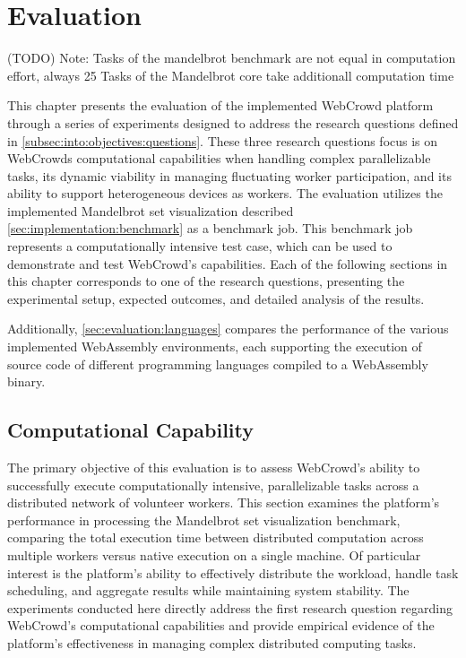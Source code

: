 \chapter{Evaluation}
\label{ch:evaluation}
(TODO) Note: Tasks of the mandelbrot benchmark are not equal in computation effort, always 25 Tasks of the Mandelbrot core take additionall computation time

This chapter presents the evaluation of the implemented WebCrowd platform through a series of experiments designed to address the research questions defined in \autoref{subsec:into:objectives:questions}. These three research questions focus is on WebCrowds computational capabilities when handling complex parallelizable tasks, its dynamic viability in managing fluctuating worker participation, and its ability to support heterogeneous devices as workers. The evaluation utilizes the implemented Mandelbrot set visualization described \autoref{sec:implementation:benchmark} as a benchmark job. This benchmark job represents a computationally intensive test case, which can be used to demonstrate and test WebCrowd's capabilities. Each of the following sections in this chapter corresponds to one of the research questions, presenting the experimental setup, expected outcomes, and detailed analysis of the results.

Additionally, \autoref{sec:evaluation:languages} compares the performance of the various implemented WebAssembly environments, each supporting the execution of source code of different programming languages compiled to a WebAssembly binary.

\section{Computational Capability}
The primary objective of this evaluation is to assess WebCrowd's ability to successfully execute computationally intensive, parallelizable tasks across a distributed network of volunteer workers. This section examines the platform's performance in processing the Mandelbrot set visualization benchmark, comparing the total execution time between distributed computation across multiple workers versus native execution on a single machine. Of particular interest is the platform's ability to effectively distribute the workload, handle task scheduling, and aggregate results while maintaining system stability. The experiments conducted here directly address the first research question regarding WebCrowd's computational capabilities and provide empirical evidence of the platform's effectiveness in managing complex distributed computing tasks.

